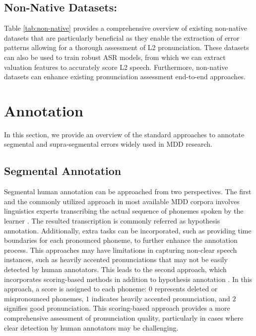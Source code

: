 \subsection{Non-Native Datasets:}
Table \ref{tab:non-native} provides a comprehensive overview of existing non-native datasets that are particularly beneficial as they enable the extraction of error patterns allowing for a thorough assessment of L2 pronunciation. These datasets can also be used to train robust ASR models, from which we can extract valuation features to accurately score L2 speech. Furthermore, non-native datasets can enhance existing pronunciation assessment end-to-end approaches.


\section{Annotation}
\label{sec:annotation}

In this section, we provide an overview of the standard approaches to annotate segmental and supra-segmental errors widely used in MDD research. 


\subsection{Segmental Annotation}

Segmental human annotation can be approached from two perspectives. The first and the commonly utilized approach in most available MDD corpora involves linguistics experts transcribing the actual sequence of phonemes spoken by the learner \cite{bonaventura2000phonetic, zhao2018l2, vidal2019epadb}. The resulted transcription is commonly referred as hypothesis annotation. Additionally, extra tasks can be incorporated, such as providing time boundaries for each pronounced phoneme, to further enhance the annotation process. This approaches may have limitations in capturing non-clear speech instances, such as heavily accented pronunciations that may not be easily detected by human annotators. This leads to the second approach, which incorporates scoring-based methods in addition to hypothesis annotation \cite{zhang2021speechocean762}. In this approach, a score is assigned to each phoneme: $0$ represents deleted or mispronounced phonemes, $1$ indicates heavily accented pronunciation, and $2$ signifies good pronunciation. This scoring-based approach provides a more comprehensive assessment of pronunciation quality, particularly in cases where clear detection by human annotators may be challenging.

